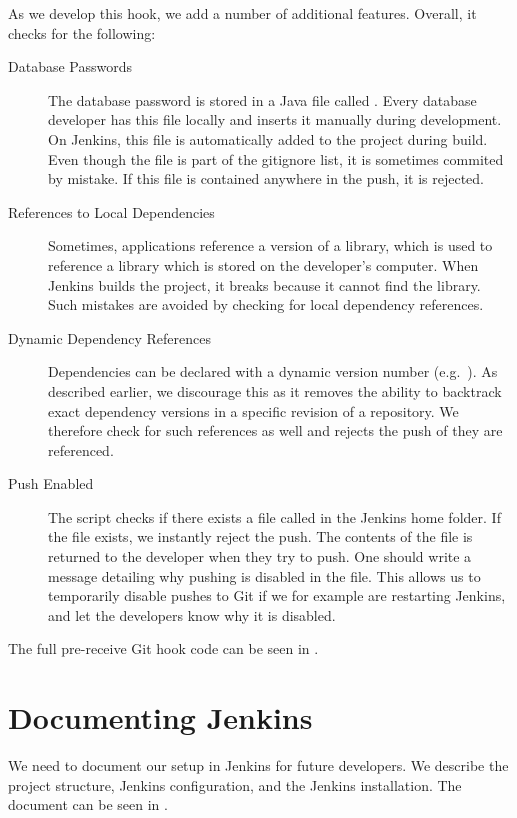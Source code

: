 As we develop this hook, we add a number of additional features. Overall, it checks for the following:
\begin{description}
  \item[Database Passwords] The database password is stored in a Java file called . Every database developer has this file locally and inserts it manually during development. On Jenkins, this file is automatically added to the project during build. Even though the file is part of the gitignore list, it is sometimes commited by mistake. If this file is contained anywhere in the push, it is rejected.
  \item[References to Local Dependencies] Sometimes, applications reference a  version of a library, which is used to reference a library which is stored on the developer's computer. When Jenkins builds the project, it breaks because it cannot find the library. Such mistakes are avoided by checking for local dependency references.
  \item[Dynamic Dependency References] Dependencies can be declared with a dynamic version number (e.g.\ ). As described earlier, we discourage this as it removes the ability to backtrack exact dependency versions in a specific revision of a repository. We therefore check for such references as well and rejects the push of they are referenced.
  \item[Push Enabled] The script checks if there exists a file called  in the Jenkins home folder. If the file exists, we instantly reject the push. The contents of the file is returned to the developer when they try to push. One should write a message detailing why pushing is disabled in the file. This allows us to temporarily disable pushes to Git if we for example are restarting Jenkins, and let the developers know why it is disabled.
\end{description}
The full pre-receive Git hook code can be seen in .

\section{Documenting Jenkins}\label{sec:jenkins_doc}
We need to document our setup in Jenkins for future developers. We describe the project structure, Jenkins configuration, and the Jenkins installation. The document can be seen in . 